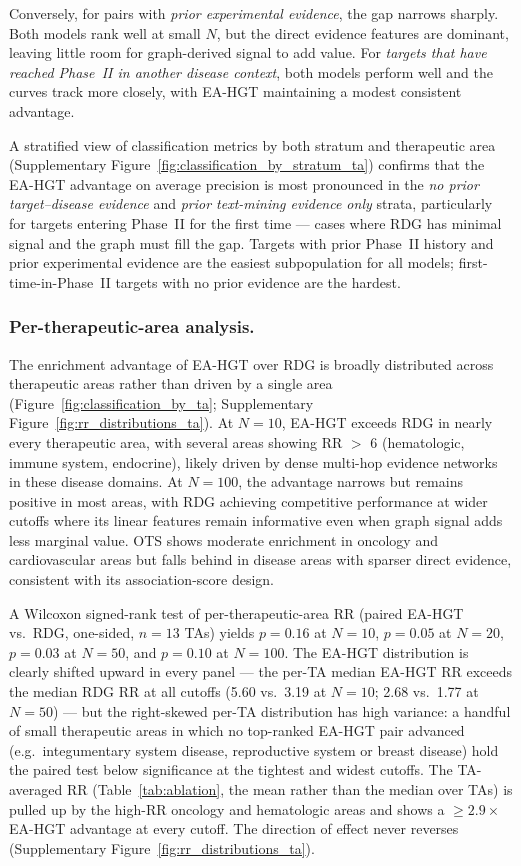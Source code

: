 \documentclass[a4,center]{NAR}
\newcommand{\eahgt}{\textsc{EA-HGT}}
\begin{document}
{Conversely, for pairs with \emph{prior experimental evidence}, the gap
narrows sharply. Both models rank well at small $N$, but the direct
evidence features are dominant, leaving little room for graph-derived
signal to add value. For \emph{targets that have reached Phase~II in
another disease context}, both models perform well and the curves track
more closely, with \eahgt{} maintaining a modest consistent advantage.

A stratified view of classification metrics by both stratum and
therapeutic area (Supplementary Figure~\ref{fig:classification_by_stratum_ta})
confirms that the \eahgt{} advantage on average precision is most
pronounced in the \emph{no prior target--disease evidence} and
\emph{prior text-mining evidence only} strata, particularly for targets
entering Phase~II for the first time --- cases where RDG has minimal
signal and the graph must fill the gap. Targets with prior Phase~II
history and prior experimental evidence are the easiest subpopulation
for all models; first-time-in-Phase~II targets with no prior evidence
are the hardest.

\subsubsection{Per-therapeutic-area analysis.}

The enrichment advantage of \eahgt{} over RDG is broadly distributed
across therapeutic areas rather than driven by a single area
(Figure~\ref{fig:classification_by_ta}; Supplementary
Figure~\ref{fig:rr_distributions_ta}). At
$N = 10$, \eahgt{} exceeds RDG in nearly every therapeutic area, with
several areas showing RR $>$ 6 (hematologic, immune system, endocrine),
likely driven by dense multi-hop evidence networks in these disease
domains. At $N = 100$, the advantage narrows but remains positive in most
areas, with RDG achieving competitive performance at wider cutoffs where
its linear features remain informative even when graph signal adds less
marginal value. OTS shows moderate enrichment in oncology and
cardiovascular areas but falls behind in disease areas with sparser direct
evidence, consistent with its association-score design.

A Wilcoxon signed-rank test of per-therapeutic-area RR (paired \eahgt{}
vs.\ RDG, one-sided, $n = 13$ TAs) yields $p = 0.16$ at $N = 10$,
$p = 0.05$ at $N = 20$, $p = 0.03$ at $N = 50$, and $p = 0.10$ at
$N = 100$. The \eahgt{} distribution is clearly shifted upward in
every panel --- the per-TA median \eahgt{} RR exceeds the median RDG
RR at all cutoffs (5.60 vs.\ 3.19 at $N = 10$; 2.68 vs.\ 1.77 at
$N = 50$) --- but the right-skewed per-TA distribution has high
variance: a handful of small therapeutic areas in which no
top-ranked \eahgt{} pair advanced (e.g.\ integumentary system
disease, reproductive system or breast disease) hold the paired test
below significance at the tightest and widest cutoffs. The
TA-averaged RR (Table~\ref{tab:ablation}, the mean rather than the
median over TAs) is pulled up by the high-RR oncology and
hematologic areas and shows a $\geq 2.9\times$ \eahgt{} advantage at
every cutoff. The direction of effect never reverses
(Supplementary Figure~\ref{fig:rr_distributions_ta}).


}
\end{document}
